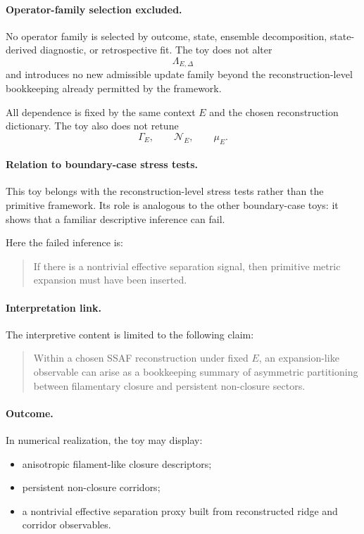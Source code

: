 \documentclass[aps,prx,onecolumn,11pt]{revtex4-2}
\theoremstyle{plain}
\theoremstyle{definition}
\theoremstyle{remark}
\begin{document}
\paragraph{Operator-family selection excluded.}

No operator family is selected by outcome, state, ensemble
decomposition, state-derived diagnostic, or retrospective fit. The toy
does not alter
\[
\Lambda_{E,\Delta}
\]
and introduces no new admissible update family beyond the
reconstruction-level bookkeeping already permitted by the framework.

All dependence is fixed by the same context \(E\) and the chosen
reconstruction dictionary. The toy also does not retune
\[
\Gamma_E,
\qquad
\mathcal N_E,
\qquad
\mu_E.
\]

\paragraph{Relation to boundary-case stress tests.}

This toy belongs with the reconstruction-level stress tests rather than
the primitive framework. Its role is analogous to the other boundary-case
toys: it shows that a familiar descriptive inference can fail.

Here the failed inference is:
\begin{quote}
If there is a nontrivial effective separation signal, then primitive
metric expansion must have been inserted.
\end{quote}

\paragraph{Interpretation link.}

The interpretive content is limited to the following claim:
\begin{quote}
Within a chosen SSAF reconstruction under fixed \(E\), an
expansion-like observable can arise as a bookkeeping summary of
asymmetric partitioning between filamentary closure and persistent
non-closure sectors.
\end{quote}

\paragraph{Outcome.}

In numerical realization, the toy may display:

\begin{itemize}
\item anisotropic filament-like closure descriptors;
\item persistent non-closure corridors;
\item a nontrivial effective separation proxy built from reconstructed
ridge and corridor observables.
\end{itemize}
\end{document}
